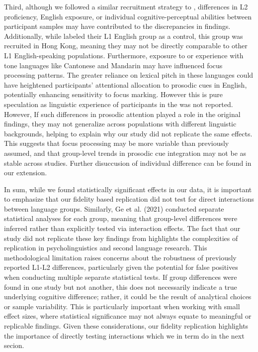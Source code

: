 Third, although we followed a similar recruitment strategy to \citep{Ge2021}, differences in L2 proficiency, English exposure, or individual cognitive-perceptual abilities between participant samples may have contributed to the discrepancies in findings. Additionally, while \citep{Ge2021} labeled their L1 English group as a control, this group was recruited in Hong Kong, meaning they may not be directly comparable to other L1 English-speaking populations. Furthermore, exposure to or experience with tone languages like Cantonese and Mandarin may have influenced focus processing patterns. The greater reliance on lexical pitch in these languages could have heightened participants’ attentional allocation to prosodic cues in English, potentially enhancing sensitivity to focus marking. However this is pure speculation as linguistic experience of participants in the \citep{Ge2021} was not reported. However, If such differences in prosodic attention played a role in the original findings, they may not generalize across populations with different linguistic backgrounds, helping to explain why our study did not replicate the same effects. This suggests that focus processing may be more variable than previously assumed, and that group-level trends in prosodic cue integration may not be as stable across studies. Further disuccusion of individual difference can be found in our extension.

In sum, while we found statistically significant effects in our data, it is important to emphasize that our fidelity based replication did not test for direct interactions between language groups. Similarly, Ge et al. (2021) conducted separate statistical analyses for each group, meaning that group-level differences were inferred rather than explicitly tested via interaction effects. The fact that our study did not replicate these key findings from \citep{Ge2021} highlights the complexities of replication in psycholinguistics and second language research. This methodological limitation raises concerns about the robustness of previously reported L1-L2 differences, particularly given the potential for false positives when conducting multiple separate statistical tests. If group differences were found in one study but not another, this does not necessarily indicate a true underlying cognitive difference; rather, it could be the result of analytical choices or sample variability. This is particularly important when working with small effect sizes, where statistical significance may not always equate to meaningful or replicable findings. Given these considerations, our fidelity replication highlights the importance of directly testing interactions which we in term do in the next secion.


